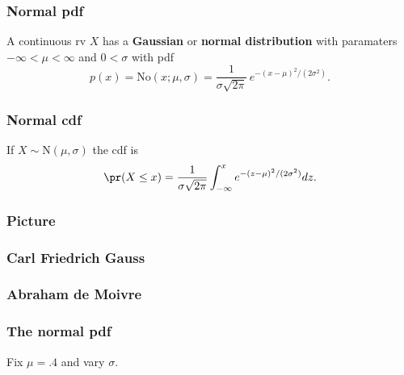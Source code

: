\begin{frame}[fragile]\frametitle{Normal pdf}


\begin{defn}
A continuous rv $X$ has a {\bf Gaussian} or {\bf normal distribution}
with paramaters
$-\infty < \mu < \infty$ and $0  < \sigma$ with pdf
$$p(x) = \mbox{No}(x;\mu,\sigma) = \frac{1}{\sigma \sqrt{2 \pi}} \, e^{-(x-\mu)^2/(2 \sigma^2)}
.$$
\end{defn}

\end{frame}



\begin{frame}[fragile]\frametitle{Normal cdf}

\begin{thm}
If $X \sim \mbox{N}(\mu,\sigma)$ the cdf is 
$$\pr(X \leq x) = \frac{1}{\sigma \sqrt{2 \pi}}\int_{-\infty}^x 
e^{-(z-\mu)^2/(2 \sigma^2)} dz.$$ 
\end{thm}


\end{frame}


\begin{frame}[fragile]\frametitle{Picture}


\end{frame}









\begin{frame}[fragile]\frametitle{Carl Friedrich Gauss}


\end{frame}


\begin{frame}[fragile]\frametitle{Abraham de Moivre}


\end{frame}


\begin{frame}[fragile]\frametitle{The normal pdf}

Fix $ \mu=.4$ and vary $\sigma$. 

\end{frame}



